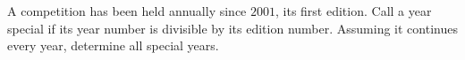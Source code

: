 A competition has been held annually since $2001$, its first edition. Call a year special if its year number is divisible by its edition number. Assuming it continues every year, determine all special years.

